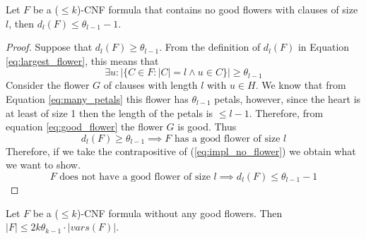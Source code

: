 \begin{lemma} \label{lem:no_good}
    Let $F$ be a ($\leq k$)-CNF formula that contains no good flowers with clauses of size $l$,
    then $d_l(F) \leq \theta_{l-1} - 1$.
\end{lemma}
\begin{proof}
    Suppose that $d_l(F) \geq \theta_{l-1}$. From the definition of $d_l(F)$ 
    in Equation \ref{eq:largest_flower}, this means that
    \begin{equation} \label{eq:many_petals}
        \exists u : |\{C \in F : |C| = l \land u \in C\}| \geq \theta_{l-1}
    \end{equation}
    Consider the flower $G$ of clauses with length $l$ with $u \in H$.
    We know that from Equation \ref{eq:many_petals} this flower has $\theta_{l-1}$ petals,
    however, since the heart is at least of size 1 then the length of the petals is $\leq l-1$.
    Therefore, from equation \ref{eq:good_flower} the flower $G$ is good.
    Thus
    \begin{equation} \label{eq:impl_no_flower}
        d_l(F) \geq \theta_{l-1} \implies F \text{ has a good flower of size $l$}
    \end{equation}
    Therefore, if we take the contrapositive of (\ref{eq:impl_no_flower}) we obtain what we want to show.
    \begin{equation}
        F \text{ does not have a good flower of size $l$}
        \implies d_l(F) \leq \theta_{l-1} - 1
    \end{equation}
\end{proof}
\begin{corollary} \label{cor:no_good}
    Let $F$ be a ($\leq k$)-CNF formula without any good flowers.
    Then $|F| \leq 2k\theta_{k-1} \cdot |vars(F)|$.
\end{corollary}
